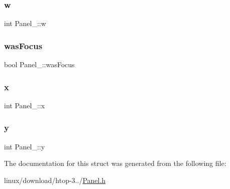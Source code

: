 \mbox{\label{structPanel___a48b6ee9417e7ea32ff844e48cd1cc136}} 
\subsubsection{\texorpdfstring{w}{w}}
{\footnotesize\ttfamily int Panel\+\_\+\+::w}

\mbox{\label{structPanel___a8d2e18d7aa784ec895c900a59785917e}} 
\subsubsection{\texorpdfstring{was\+Focus}{wasFocus}}
{\footnotesize\ttfamily bool Panel\+\_\+\+::was\+Focus}

\mbox{\label{structPanel___aac13fd8a2bd1346b05b32c89a7f52c4d}} 
\subsubsection{\texorpdfstring{x}{x}}
{\footnotesize\ttfamily int Panel\+\_\+\+::x}

\mbox{\label{structPanel___a8da8fe39daf24ede79339f5710434bdd}} 
\subsubsection{\texorpdfstring{y}{y}}
{\footnotesize\ttfamily int Panel\+\_\+\+::y}



The documentation for this struct was generated from the following file\+:\begin{DoxyCompactItemize}
\item 
linux/download/htop-\/3../\hyperlink{Panel_8h}{Panel.\+h}\end{DoxyCompactItemize}
